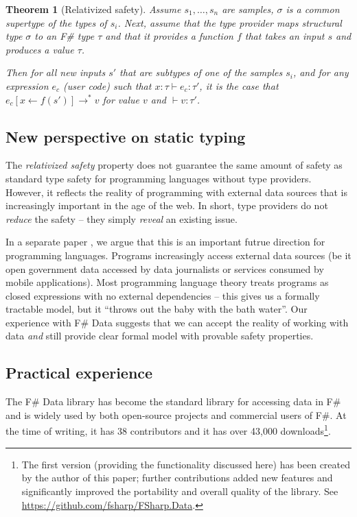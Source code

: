 \documentclass[preprint]{sigplanconf}
\newtheorem{theorem}{Theorem}
\begin{document}
\begin{theorem}[Relativized safety]
\label{thm:safety}
Assume $s_1, \ldots, s_n$ are samples, $\sigma$ is a common supertype of the types of $s_i$.
Next, assume that the type provider maps structural type $\sigma$ to an F\# type $\tau$ and that
it provides a function $f$ that takes an input $s$ and produces a value $\tau$.

Then for all new inputs $s'$ that are subtypes of one of the samples $s_i$, and for any expression
$e_c$ (user code) such that $x:\tau \vdash e_c:\tau'$, it is the case that
$e_c[x\leftarrow f(s')] \rightarrow^{*} v$ for value $v$ and $\vdash v:\tau'$.
\end{theorem}

\subsection{New perspective on static typing}

The \emph{relativized safety} property does not guarantee the same amount of safety as standard
type safety for programming languages without type providers. However, it reflects the reality of
programming with external data sources that is increasingly important in the age of the web.
In short, type providers do not \emph{reduce} the safety -- they simply \emph{reveal} an existing issue.

In a separate paper \cite{age-of-web}, we argue that this is an important futrue direction for
programming languages. Programs increasingly access external data sources (be it open government
data accessed by data journalists or services consumed by mobile applications). Most programming
language theory treats programs as closed expressions with no external dependencies -- this gives
us a formally tractable model, but it ``throws out the baby with the bath water''. Our experience
with F\# Data suggests that we can accept the reality of working with data \emph{and} still
provide clear formal model with provable safety properties.

\subsection{Practical experience}

The F\# Data library has become the standard library for accessing data in F\# and is widely used
by both open-source projects and commercial users of F\#. At the time of writing, it has 38
contributors and it has over 43,000 downloads\footnote{The first version (providing the functionality
discussed here) has been created by the author of this paper; further contributions added new features
and significantly improved the portability and overall quality of the library.
See \url{https://github.com/fsharp/FSharp.Data}.}.
\end{document}
